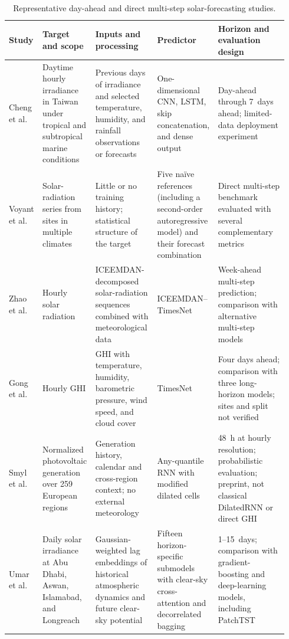\begin{table}[!htbp]
\centering
\caption{Representative day-ahead and direct multi-step solar-forecasting
studies.}
\label{tab:literature_review_multistep}
\scriptsize
\setlength{\tabcolsep}{2.5pt}
\renewcommand{\arraystretch}{1.12}
\begin{tabular}{@{}p{0.11\linewidth}p{0.18\linewidth}p{0.22\linewidth}p{0.18\linewidth}p{0.25\linewidth}@{}}
\toprule
\textbf{Study} & \textbf{Target and scope} & \textbf{Inputs and processing} &
\textbf{Predictor} & \textbf{Horizon and evaluation design} \\
\midrule
Cheng et al.\ \cite{cheng2021} &
Daytime hourly irradiance in Taiwan under tropical and subtropical marine conditions &
Previous days of irradiance and selected temperature, humidity, and rainfall observations or forecasts &
One-dimensional CNN, LSTM, skip concatenation, and dense output &
Day-ahead through 7~days ahead; limited-data deployment experiment \\

Voyant et al.\ \cite{voyant2022} &
Solar-radiation series from sites in multiple climates &
Little or no training history; statistical structure of the target &
Five na\"ive references (including a second-order autoregressive model) and their forecast combination &
Direct multi-step benchmark evaluated with several complementary metrics \\

Zhao et al.\ \cite{zhao2024timesnet} &
Hourly solar radiation &
ICEEMDAN-decomposed solar-radiation sequences combined with meteorological data &
ICEEMDAN--TimesNet &
Week-ahead multi-step prediction; comparison with alternative multi-step models \\

Gong et al.\ \cite{gong2024timesnet} &
Hourly GHI &
GHI with temperature, humidity, barometric pressure, wind speed, and cloud cover &
TimesNet &
Four days ahead; comparison with three long-horizon models; sites and split not verified \\

Smyl et al.\ \cite{smyl2026solar} &
Normalized photovoltaic generation over 259 European regions &
Generation history, calendar and cross-region context; no external meteorology &
Any-quantile RNN with modified dilated cells &
48~h at hourly resolution; probabilistic evaluation; preprint, not classical DilatedRNN or direct GHI \\

Umar et al.\ \cite{umar2026daily} &
Daily solar irradiance at Abu Dhabi, Aswan, Islamabad, and Longreach &
Gaussian-weighted lag embeddings of historical atmospheric dynamics and future clear-sky potential &
Fifteen horizon-specific submodels with clear-sky cross-attention and decorrelated bagging &
1--15~days; comparison with gradient-boosting and deep-learning models, including PatchTST \\
\bottomrule
\end{tabular}
\end{table}

